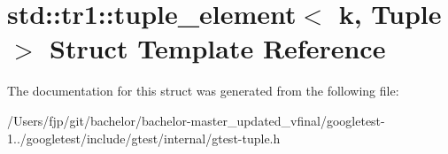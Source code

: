 \hypertarget{structstd_1_1tr1_1_1tuple__element}{}\section{std\+:\+:tr1\+:\+:tuple\+\_\+element$<$ k, Tuple $>$ Struct Template Reference}
\label{structstd_1_1tr1_1_1tuple__element}


The documentation for this struct was generated from the following file\+:\begin{DoxyCompactItemize}
\item 
/\+Users/fjp/git/bachelor/bachelor-\/master\+\_\+updated\+\_\+vfinal/googletest-\/1../googletest/include/gtest/internal/gtest-\/tuple.\+h\end{DoxyCompactItemize}

